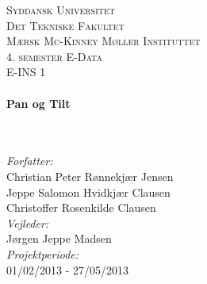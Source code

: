 \documentclass[rapport.tex]{subfiles}
\begin{document}
\begin{titlepage}
\begin{center}
\textsc{\LARGE Syddansk Universitet}\\[0.2cm]
\textsc{\Large Det Tekniske Fakultet\\[0.2cm] Mærsk Mc-Kinney Møller Instituttet}\\[0.5cm]
\textsc{\Large 4. semester E-Data}\\{\Large E-INS 1} \\[0.5cm]
 \HRule \\[0.6cm]
 { \huge \bfseries Pan og Tilt}\\[0.25cm]
\HRule \\[0.6cm]
 \begin{minipage}{0.45\textwidth}
 \begin{flushleft} \large
\hfill\\
 \emph{Forfatter:}\\[-0.2cm]
		Christian Peter Rønnekjær Jensen\\[-0.2cm]
 		Jeppe Salomon Hvidkjær Clausen\\[-0.2cm]
		Christoffer Rosenkilde Clausen\\[0.2cm]
 \emph{Vejleder:}\\[-0.2cm]
 Jørgen Jeppe Madsen\\[0.2cm]
 {\large \emph{Projektperiode:}\\[-0.2cm]
01/02/2013 - 27/05/2013}
 \end{flushleft}
 \end{minipage}
\vfill
\end{center}
\end{titlepage}
\end{document}
